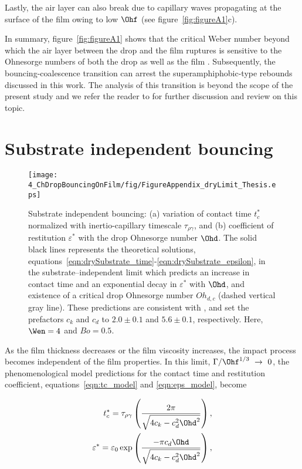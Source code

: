 \begin{subappendices}
	Lastly, the air layer can also break due to capillary waves propagating at the surface of the film owing to low $\Ohf$ (see figure~\ref{fig:figureA1}c). 
	
	In summary, figure~\ref{fig:figureA1} shows that the critical Weber number beyond which the air layer between the drop and the film ruptures is sensitive to the Ohnesorge numbers of both the drop as well as the film \citep{tang2016nonmonotonic, tang2018bouncing}. Subsequently, the bouncing-coalescence transition can arrest the superamphiphobic-type rebounds discussed in this work. The analysis of this transition is beyond the scope of the present study and we refer the reader to \citet{lohse-2020-pnas, SprittlesPhysRevLett.124.084501} for further discussion and review on this topic.
	
	\section{Substrate independent bouncing}
	\label{app:SubstrateIndependentBouncing}
	\begin{figure}
		\centering
		\texttt{[image: 4\_ChDropBouncingOnFilm/fig/FigureAppendix\_dryLimit\_Thesis.eps]}
		\caption{Substrate independent bouncing: (a) variation of contact time $t_c^*$ normalized with inertio-capillary timescale $\tau_{\rho\gamma}$, and (b) coefficient of restitution $\varepsilon^*$ with the drop Ohnesorge number $\Ohd$. The solid black lines represents the theoretical solutions,  equations~\eqref{eqn:drySubstrate_time}-\eqref{eqn:drySubstrate_epsilon}, in the substrate--independent limit which predicts an increase in contact time and an exponential decay in $\varepsilon^*$ with $\Ohd$, and existence of a critical drop Ohnesorge number $Oh_{d,c}$ (dashed vertical gray line). These predictions are consistent with \citet{jha2020viscous}, and set the prefactors $c_{k}$ and $c_{d}$ to $2.0 \pm 0.1$ and $5.6 \pm 0.1$, respectively. Here, $\Wen = 4$ and $Bo = 0.5$.}
		\label{fig:appendix_drylimit_figure}
	\end{figure}
	
	As the film thickness decreases or the film viscosity increases, the impact process becomes independent of the film properties. 
	In this limit, $\Gamma/\Ohf^{1/3}~\to~0$, the phenomenological model predictions for the contact time and restitution coefficient, equations~\eqref{eqn:tc_model} and \eqref{eqn:eps_model}, become
	
	\begin{align}
		\label{eqn:drySubstrate_time}
		t_c^*= \tau_{\rho\gamma} &\left(\frac{2\pi}{\sqrt{4c_{k} - c_{d}^{2} \Ohd^{2}}}\right),\\
		\label{eqn:drySubstrate_epsilon}
		\varepsilon^* = \varepsilon_0\exp &\left( \frac{-\pi c_{d} \Ohd}{\sqrt{4c_{k} - c_{d}^{2} \Ohd^{2}}} \right),
	\end{align}


\end{subappendices}
